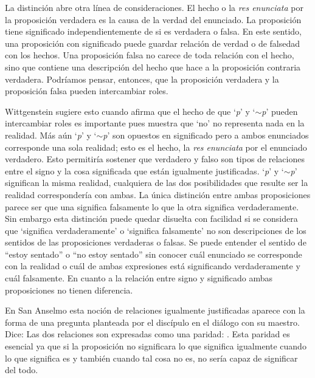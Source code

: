 La distinción abre otra línea de consideraciones. El hecho o la \emph{res
  enunciata} por la proposición verdadera es la causa de la verdad del
enunciado. La proposición tiene significado independientemente de si es
verdadera o falsa. En este sentido, una proposición con significado puede
guardar relación de verdad o de falsedad con los hechos. Una proposición falsa
no carece de toda relación con el hecho, sino que contiene una descripción del
hecho que hace a la proposición contraria verdadera. Podríamos pensar, entonces,
que la proposición verdadera y la proposición falsa pueden intercambiar roles.

Wittgenstein sugiere esto cuando afirma que el hecho de que `\emph{p}' y
`$\sim$\emph{p}' pueden intercambiar roles es importante pues muestra que `no'
no representa nada en la realidad. Más aún `\emph{p}' y `$\sim$\emph{p}' son
opuestos en significado pero a ambos enunciados corresponde una sola realidad;
esto es el hecho, la \emph{res enunciata} por el enunciado verdadero. Esto
permitiría sostener que verdadero y falso son tipos de relaciones entre el signo
y la cosa significada que están igualmente justificadas. `\emph{p}' y
`$\sim$\emph{p}' significan la misma realidad, cualquiera de las dos
posibilidades que resulte ser la realidad correspondería con ambas. La única
distinción entre ambas proposiciones parece ser que una significa falsamente lo
que la otra significa verdaderamente. Sin embargo esta distinción puede quedar
disuelta con facilidad si se considera que `significa verdaderamente' o
`significa falsamente' no son descripciones de los sentidos de las proposiciones
verdaderas o falsas. Se puede entender el sentido de ``estoy sentado'' o ``no
estoy sentado'' sin conocer cuál enunciado se corresponde con la realidad o cuál
de ambas expresiones está significando verdaderamente y cuál falsamente. En
cuanto a la relación entre signo y significado ambas proposiciones no tienen
diferencia.

En San Anselmo esta noción de relaciones igualmente justificadas aparece con la
forma de una pregunta planteada por el discípulo en el diálogo con su maestro.
Dice: 
Las dos relaciones son expresadas como una paridad: . Esta paridad es
esencial ya que si la proposición no significara lo que significa igualmente
cuando lo que significa es y también cuando tal cosa no es, no sería capaz de
significar del todo.

